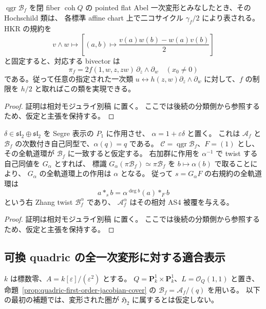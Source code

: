 \begin{proposition}
\label{prop:quadric-jacobian-abelian-class}
$\operatorname{qgr}\mathcal B_f$ を閉 fiber $\operatorname{coh}Q$ の
pointed flat Abel 一次変形とみなしたとき、その Hochschild 類は、
各標準 affine chart 上で二コサイクル $\gamma_f/2$ により表される。
HKR の規約を
\[
 v\wedge w\longmapsto
 \left[(a,b)\longmapsto
   \frac{v(a)w(b)-w(a)v(b)}2\right]
\]
と固定すると、対応する bivector は
\[
 \pi_f=2f(1,w,z,zw)\,\partial_z\wedge\partial_w
 \quad (x_0\ne0)
\]
である。従って任意の指定された一次類
$u\leftrightarrow h(z,w)\partial_z\wedge\partial_w$
に対して、$f$ の制限を $h/2$ と取ればこの類を実現できる。
\end{proposition}
\begin{proof}
証明は相対モジュライ別稿 \cite[\texttt{quadric_first_order} 節]{QuadricModuli2026} に置く。
ここでは後続の分類側から参照するため、仮定と主張を保持する。
\end{proof}

\begin{lemma}
\label{lem:quadric-first-order-root-twist}
$\delta\in\mathfrak{sl}_2\oplus\mathfrak{sl}_2$ を Segre 表示の $P_1$ に作用させ、
$\alpha=1+\varepsilon\delta$ と置く。
これは $\mathcal A_f$ と $\mathcal B_f$ の次数付き自己同型で、$\alpha(q)=q$ である。
$\mathcal C=\operatorname{qgr}\mathcal B_f$、$F=(1)$ とし、
その全軌道環が $\mathcal B_f$ に一致すると仮定する。
右加群に作用を $\alpha^{-1}$ で twist する自己同値を $G_\alpha$ とすれば、
標識 $G_\alpha(\pi\mathcal B_f)\simeq\pi\mathcal B_f$ を
$b\mapsto\alpha(b)$ で取ることにより、
$G_\alpha$ の全軌道環上の作用は $\alpha$ となる。
従って $s=G_\alpha F$ の右規約の全軌道環は
\[
 a*_{s}b=\alpha^{\deg b}(a)*_Fb
\]
という右 Zhang twist $\mathcal B_f^\alpha$ であり、
$\mathcal A_f^\alpha$ はその相対 AS4 被覆を与える。
\end{lemma}
\begin{proof}
証明は相対モジュライ別稿 \cite[\texttt{quadric_first_order} 節]{QuadricModuli2026} に置く。
ここでは後続の分類側から参照するため、仮定と主張を保持する。
\end{proof}


\subsection{可換 quadric の全一次変形に対する適合表示}
\label{subsec:quadric-first-order-bridge}

$k$ は標数零、$A=k[\varepsilon]/(\varepsilon^2)$ とする。
$Q=\mathbf P^1_k\times\mathbf P^1_k$、$L=\mathcal O_Q(1,1)$ と置き、
命題~\ref{prop:quadric-first-order-jacobian-cover} の
$\mathcal B_f=\mathcal A_f/(q)$ を用いる。
以下の最初の補題では、変形された圏が $\mathfrak H_2$ に属するとは仮定しない。

